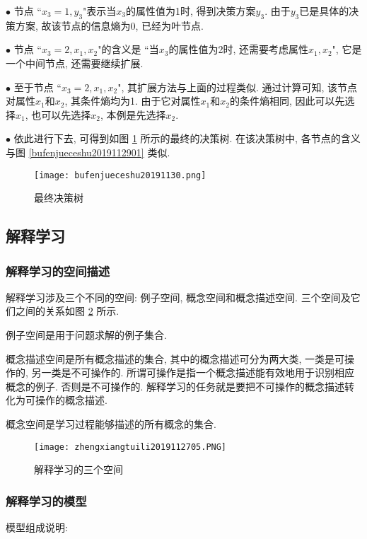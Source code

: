 $\bullet$ 节点 ``$x_3=1, y_3$"表示当$x_3$的属性值为1时, 得到决策方案$y_3$. 由于$y_3$已是具体的决策方案, 故该节点的信息熵为0, 已经为叶节点.

$\bullet$ 节点 ``$x_3=2, x_1,x_2$"的含义是 ``当$x_3$的属性值为2时, 还需要考虑属性$x_1,x_2$", 它是一个中间节点, 还需要继续扩展.

$\bullet$ 至于节点 ``$x_3=2, x_1,x_2$", 其扩展方法与上面的过程类似. 通过计算可知, 该节点对属性$x_1$和$x_2$, 其条件熵均为1.
由于它对属性$x_1$和$x_2$的条件熵相同, 因此可以先选择$x_1$, 也可以先选择$x_2$, 本例是先选择$x_2$.

$\bullet$ 依此进行下去, 可得到如图 \ref{bufenjueceshu2019112902} 所示的最终的决策树.
在该决策树中, 各节点的含义与图 \ref{bufenjueceshu2019112901} 类似.
\begin{figure}[H]
\centering
\texttt{[image: bufenjueceshu20191130.png]}
\caption{最终决策树}
\label{bufenjueceshu2019112902}
\end{figure}
\subsection{解释学习}
\subsubsection{解释学习的空间描述}
解释学习涉及三个不同的空间: 例子空间, 概念空间和概念描述空间.
三个空间及它们之间的关系如图 \ref{AI32fig2705} 所示.

 例子空间是用于问题求解的例子集合.

 概念描述空间是所有概念描述的集合, 其中的概念描述可分为两大类, 一类是可操作的, 另一类是不可操作的.
所谓可操作是指一个概念描述能有效地用于识别相应概念的例子. 否则是不可操作的.
解释学习的任务就是要把不可操作的概念描述转化为可操作的概念描述.

 概念空间是学习过程能够描述的所有概念的集合.

\begin{figure}[H]
\centering
\texttt{[image: zhengxiangtuili2019112705.PNG]}
\caption{解释学习的三个空间}
\label{AI32fig2705}
\end{figure}
\subsubsection{解释学习的模型}
模型组成说明:

